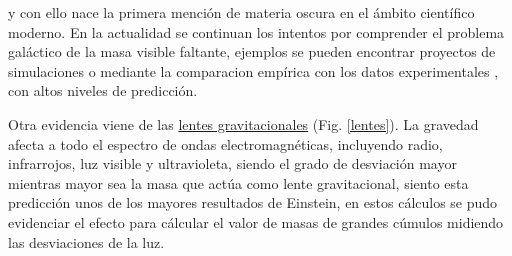 
y con ello nace la primera mención de materia oscura en el ámbito científico moderno. En la actualidad se continuan los intentos por comprender el problema galáctico de la masa visible faltante, ejemplos se pueden encontrar proyectos de simulaciones \citep{deur_relativistic_2020, wu_galactic_2015} o mediante la comparacion empírica con los datos experimentales \cite{mielke_dark_2006}, con altos niveles de predicción.

Otra evidencia viene de las \href{https://en.wikipedia.org/wiki/Gravitational_lens}{lentes gravitacionales} (Fig. \ref{lentes}). La gravedad afecta a todo el espectro de ondas electromagnéticas, incluyendo radio, infrarrojos, luz visible y ultravioleta, siendo el grado de desviación mayor mientras mayor sea la masa que actúa como lente gravitacional, siento esta predicción unos de los mayores resultados de Einstein, en estos cálculos se pudo evidenciar el efecto para cálcular el valor de masas de grandes cúmulos midiendo las desviaciones de la luz.

